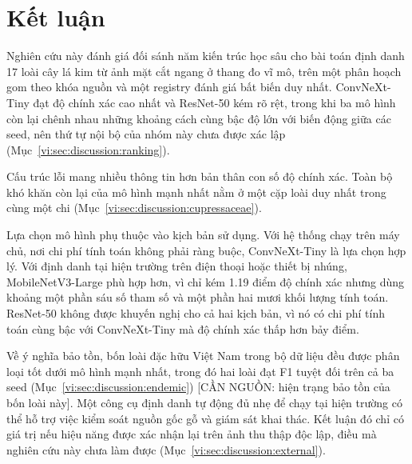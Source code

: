 %
%

\section{Kết luận}
\label{vi:sec:conclusion}

Nghiên cứu này đánh giá đối sánh năm kiến trúc học sâu cho bài toán định danh
17 loài cây lá kim từ ảnh mặt cắt ngang ở thang đo vĩ mô, trên một phân hoạch
gom theo khóa nguồn và một registry đánh giá bất biến duy nhất. ConvNeXt-Tiny
đạt độ chính xác cao nhất và ResNet-50 kém rõ rệt, trong khi ba mô hình còn lại
chênh nhau những khoảng cách cùng bậc độ lớn với biến động giữa các seed, nên
thứ tự nội bộ của nhóm này chưa được xác lập
(Mục~\ref{vi:sec:discussion:ranking}).

Cấu trúc lỗi mang nhiều thông tin hơn bản thân con số độ chính xác. Toàn bộ khó
khăn còn lại của mô hình mạnh nhất nằm ở một cặp loài duy nhất trong cùng một
chi (Mục~\ref{vi:sec:discussion:cupressaceae}).

Lựa chọn mô hình phụ thuộc vào kịch bản sử dụng. Với hệ thống chạy trên máy
chủ, nơi chi phí tính toán không phải ràng buộc, ConvNeXt-Tiny là lựa chọn hợp
lý. Với định danh tại hiện trường trên điện thoại hoặc thiết bị nhúng,
MobileNetV3-Large phù hợp hơn, vì chỉ kém 1.19 điểm độ chính xác nhưng dùng
khoảng một phần sáu số tham số và một phần hai mươi khối lượng tính toán.
ResNet-50 không được khuyến nghị cho cả hai kịch bản, vì nó có chi phí tính
toán cùng bậc với ConvNeXt-Tiny mà độ chính xác thấp hơn bảy điểm.

Về ý nghĩa bảo tồn, bốn loài đặc hữu Việt Nam trong bộ dữ liệu đều được phân
loại tốt dưới mô hình mạnh nhất, trong đó hai loài đạt F1 tuyệt đối trên cả ba
seed (Mục~\ref{vi:sec:discussion:endemic})
[CẦN NGUỒN: hiện trạng bảo tồn của bốn loài này]. Một công cụ định danh tự động
đủ nhẹ để chạy tại hiện trường có thể hỗ trợ việc kiểm soát nguồn gốc gỗ và
giám sát khai thác. Kết luận đó chỉ có giá trị nếu hiệu năng được xác nhận lại
trên ảnh thu thập độc lập, điều mà nghiên cứu này chưa làm được
(Mục~\ref{vi:sec:discussion:external}).

